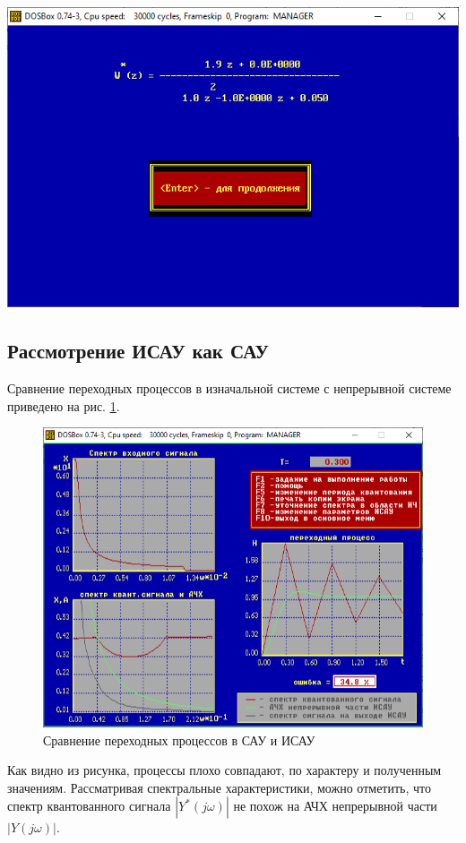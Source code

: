 \begin{center}
\begin{minipage}{.45\textwidth}
		\end{minipage} \begin{minipage}{.45\textwidth}
			\includegraphics[width=\textwidth]{png/w(z).png}
		\end{minipage}
		\label{input}
	\end{center}
	
	\subsection{Рассмотрение ИСАУ как САУ}
	
	Сравнение переходных процессов в изначальной системе с непрерывной системе приведено на рис. \ref{tipoSau1}.
	
	\begin{figure}[h]
		\centering\includegraphics[width=.6\textwidth]{png/graph1.png}
		\caption{Сравнение переходных процессов в САУ и ИСАУ}
		\label{tipoSau1}
	\end{figure}
	
	Как видно из рисунка, процессы плохо совпадают, по характеру и полученным значениям. Рассматривая спектральные характеристики, можно отметить, что спектр квантованного сигнала $\left|Y^* (j\omega)\right|$ не похож на АЧХ непрерывной части $\left|Y(j\omega)\right|$.
	
